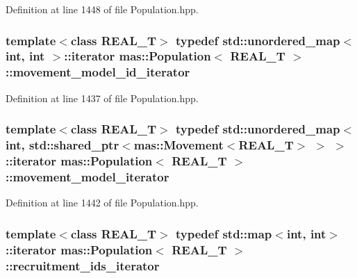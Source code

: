 Definition at line 1448 of file Population.\-hpp.

\hypertarget{classmas_1_1_population_a60d48584943ae2846d15045f7696aafb}{
\subsubsection[{movement\-\_\-model\-\_\-id\-\_\-iterator}]{\setlength{\rightskip}{0pt plus 5cm}template$<$class R\-E\-A\-L\-\_\-\-T$>$ typedef std\-::unordered\-\_\-map$<$int, int $>$\-::iterator {\bf mas\-::\-Population}$<$ R\-E\-A\-L\-\_\-\-T $>$\-::{\bf movement\-\_\-model\-\_\-id\-\_\-iterator}}}\label{classmas_1_1_population_a60d48584943ae2846d15045f7696aafb}


Definition at line 1437 of file Population.\-hpp.

\hypertarget{classmas_1_1_population_a7c0c3438d8b5c223cb3ca7072d5e84bc}{
\subsubsection[{movement\-\_\-model\-\_\-iterator}]{\setlength{\rightskip}{0pt plus 5cm}template$<$class R\-E\-A\-L\-\_\-\-T$>$ typedef std\-::unordered\-\_\-map$<$int, std\-::shared\-\_\-ptr$<${\bf mas\-::\-Movement}$<$R\-E\-A\-L\-\_\-\-T$>$ $>$ $>$\-::iterator {\bf mas\-::\-Population}$<$ R\-E\-A\-L\-\_\-\-T $>$\-::{\bf movement\-\_\-model\-\_\-iterator}}}\label{classmas_1_1_population_a7c0c3438d8b5c223cb3ca7072d5e84bc}


Definition at line 1442 of file Population.\-hpp.

\hypertarget{classmas_1_1_population_a0aaaac61b68d5d8aa0e385067e05283c}{
\subsubsection[{recruitment\-\_\-ids\-\_\-iterator}]{\setlength{\rightskip}{0pt plus 5cm}template$<$class R\-E\-A\-L\-\_\-\-T$>$ typedef std\-::map$<$int, int$>$\-::iterator {\bf mas\-::\-Population}$<$ R\-E\-A\-L\-\_\-\-T $>$\-::{\bf recruitment\-\_\-ids\-\_\-iterator}}}\label{classmas_1_1_population_a0aaaac61b68d5d8aa0e385067e05283c}



